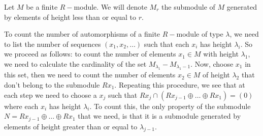 \begin{dang}
    \begin{notation}
        Let $M$ be a finite $R-$module. We will denote $M_r$ the submodule of $M$ generated by elements of height less than or equal to $r$.
    \end{notation}
\end{dang}

To count the number of automorphisms of a finite $R-$module of type $\lambda$, we need to list the number of 
sequences $(x_1,x_2,\dots)$ such that each $x_i$ has height $\lambda_i$. So we proceed as follows: to count the number of 
elements $x_1\in M$ with height $\lambda_1$, we need to calculate the cardinality of the set $M_{\lambda_1}-M_{\lambda_1-1}$. 
Now, choose $x_1$ in this set, then we need to count the number of elements $x_2\in M$ of height $\lambda_2$ that don't belong to the 
submodule $Rx_1$. Repeating this procedure, we see that at each step we need to choose a $x_j$ such that 
$Rx_j\cap (Rx_{j-1}\oplus\dots\oplus Rx_1)=(0)$ where each $x_i$ has height $\lambda_i$. To count this, 
the only property of the submodule $N=Rx_{j-1}\oplus\dots\oplus Rx_1$ that we need, is that it is a submodule 
generated by elements of height greater than or equal to $\lambda_{j-1}$.

